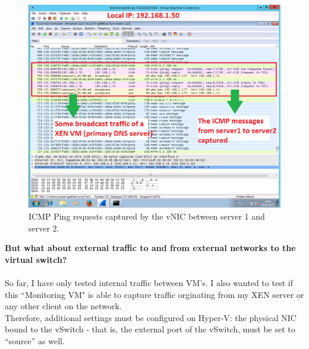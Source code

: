 \documentclass[11pt, a4paper]{article}
\begin{document}
\begin{figure}[h]
    \centering
    \includegraphics[width=1\textwidth]{HyperV_8.png}
   \caption{ICMP Ping requests captured by the vNIC between server 1 and server 2.}
\end{figure}
\clearpage
\textbf{But what about external traffic to and from external networks to the virtual switch?} \\ \\
So far, I have only tested internal traffic between VM's. I also wanted to test if this ``Monitoring VM" is able to capture traffic orginating from my XEN server or any other client on the network. \\
Therefore, additional settings must be configured on Hyper-V: the physical NIC bound to the vSwitch - that is, the external port of the vSwitch, must be set to ``source'' as well.
\end{document}
